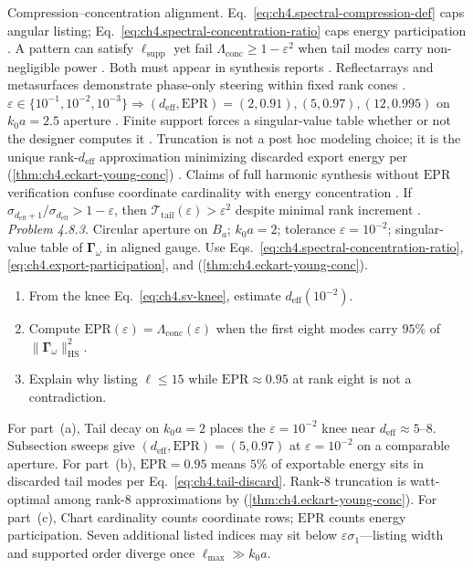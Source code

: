 Compression--concentration alignment. Eq.~\eqref{eq:ch4.spectral-compression-def} caps angular listing; Eq.~\eqref{eq:ch4.spectral-concentration-ratio} caps energy participation
\cite{hansen1988}. A pattern can satisfy \(\ell_{\mathrm{supp}}\) yet fail \(\Lambda_{\mathrm{conc}}\ge1-\varepsilon^{2}\) when
tail modes carry non-negligible power \cite{devaney2004}. Both must appear in synthesis reports \cite{stratton1941}.
Reflectarrays and metasurfaces demonstrate phase-only steering within fixed rank cones \cite{harrington2001}.
\(\varepsilon\in\{10^{-1},10^{-2},10^{-3}\}\Rightarrow(d_{\mathrm{eff}},\mathrm{EPR})=(2,0.91),(5,0.97),(12,0.995)\) on \(k_{0}a=2.5\) aperture
\cite{hansen1988}.
Finite support forces a singular-value table whether or not the designer computes it \cite{stratton1941}. Truncation is
not a post hoc modeling choice; it is the unique rank-\(d_{\mathrm{eff}}\) approximation minimizing discarded export energy per
(\ref{thm:ch4.eckart-young-conc}) \cite{devaney2004}. Claims of full harmonic synthesis without \(\mathrm{EPR}\) verification confuse coordinate
cardinality with energy concentration \cite{harrington2001}.
\label{cor:ch4.tail-dominated}
If \(\sigma_{d_{\mathrm{eff}}+1}/\sigma_{d_{\mathrm{eff}}}>1-\varepsilon\), then \(\mathcal{T}_{\mathrm{tail}}(\varepsilon)>\varepsilon^{2}\) despite minimal rank increment
\cite{hansen1988}.
\emph{Problem 4.8.3.} Circular aperture on $B_{a}$; $k_{0}a=2$; tolerance $\varepsilon=10^{-2}$; singular-value table of $\boldsymbol{\Gamma}_\omega$ in aligned gauge. Use Eqs.~\eqref{eq:ch4.spectral-concentration-ratio}, \eqref{eq:ch4.export-participation}, and (\ref{thm:ch4.eckart-young-conc}).
\begin{enumerate}
\item[(a)] From the knee Eq.~\eqref{eq:ch4.sv-knee}, estimate $d_{\mathrm{eff}}(10^{-2})$.
\item[(b)] Compute $\mathrm{EPR}(\varepsilon)=\Lambda_{\mathrm{conc}}(\varepsilon)$ when the first eight modes carry $95\%$ of $\|\boldsymbol{\Gamma}_\omega\|_{\mathrm{HS}}^{2}$.
\item[(c)] Explain why listing $\ell\le15$ while $\mathrm{EPR}\approx0.95$ at rank eight is not a contradiction.
\end{enumerate}
For part~(a), Tail decay on $k_{0}a=2$ places the $\varepsilon=10^{-2}$ knee near $d_{\mathrm{eff}}\approx5$--$8$. Subsection sweeps give $(d_{\mathrm{eff}},\mathrm{EPR})=(5,0.97)$ at $\varepsilon=10^{-2}$ on a comparable aperture.
For part~(b), $\mathrm{EPR}=0.95$ means $5\%$ of exportable energy sits in discarded tail modes per Eq.~\eqref{eq:ch4.tail-discard}. Rank-$8$ truncation is watt-optimal among rank-$8$ approximations by (\ref{thm:ch4.eckart-young-conc}).
For part~(c), Chart cardinality counts coordinate rows; $\mathrm{EPR}$ counts energy participation. Seven additional listed indices may sit below $\varepsilon\sigma_{1}$---listing width and supported order diverge once $\ell_{\max}\gg k_{0}a$.
